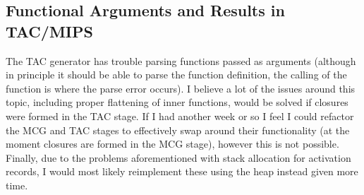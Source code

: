\documentclass[12pt]{article}
\begin{document}
\subsection{Functional Arguments and Results in TAC/MIPS}
The TAC generator has trouble parsing functions passed as arguments (although in principle it should be able to parse the function definition, the calling of the function is where the parse error occurs). I believe a lot of the issues around this topic, including proper flattening of inner functions, would be solved if closures were formed in the TAC stage. If I had another week or so I feel I could refactor the MCG and TAC stages to effectively swap around their functionality (at the moment closures are formed in the MCG stage), however this is not possible.\\\newline
Finally, due to the problems aforementioned with stack allocation for activation records, I would most likely reimplement these using the heap instead given more time. 
\printbibliography
\end{document}
